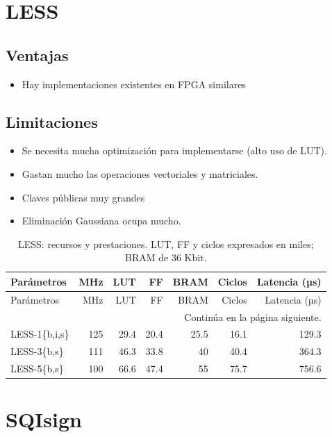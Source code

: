 \section{LESS}

\subsection*{Ventajas}
\begin{itemize}
\item Hay implementaciones existentes en FPGA similares
\end{itemize}

\subsection*{Limitaciones}
\begin{itemize}
\item Se necesita mucha optimización para implementarse (alto uso de LUT).
\item Gastan mucho las operaciones vectoriales y matriciales.
\item Claves públicas muy grandes
\item Eliminación Gaussiana ocupa mucho.
\end{itemize}

\begingroup
\small
\setlength{\tabcolsep}{3pt}
\setlength{\LTcapwidth}{\textwidth}
\begin{longtable}{lrrrrrr}
\caption{LESS: recursos y prestaciones. LUT, FF y ciclos expresados en miles; BRAM de 36 Kbit.}\label{tab:eval-less}\\
\toprule
Parámetros & MHz & LUT & FF & BRAM & Ciclos & Latencia (µs) \\
\midrule
\endfirsthead
\toprule
Parámetros & MHz & LUT & FF & BRAM & Ciclos & Latencia (µs) \\
\midrule
\endhead
\midrule
\multicolumn{7}{r}{\small Continúa en la página siguiente.}\\
\endfoot
\bottomrule
\endlastfoot
{LESS-1\{b,i,s\}} & {125} & {29.4} & {20.4} & {25.5} & {16.1} & {129.3} \\
{LESS-3\{b,s\}} & {111} & {46.3} & {33.8} & {40} & {40.4} & {364.3} \\
{LESS-5\{b,s\}} & {100} & {66.6} & {47.4} & {55} & {75.7} & {756.6} \\
\end{longtable}
\endgroup


\section{SQIsign}

